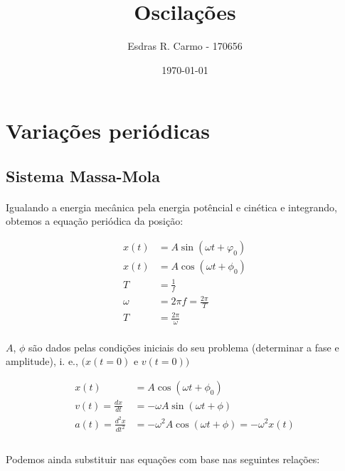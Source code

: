 \documentclass{article}
\author{Esdras R. Carmo - 170656}
\title{Oscilações}
\date{\today}
\begin{document}
    \maketitle
    
    \section{Variações periódicas}
        \subsection{Sistema Massa-Mola}
            \paragraph{}
            Igualando a energia mecânica pela energia potêncial e cinética e integrando, obtemos a equação periódica da
            posição:

            \begin{align*}
                x(t) &= A\sin{(\omega t + \varphi_0)}\\
                x(t) &= A\cos{(\omega t + \phi_0)}\\
                T &= \frac{1}{f}\\
                \omega &= 2\pi f = \frac{2\pi}{T}\\
                T &= \frac{2\pi}{\omega}
            \end{align*}

            \paragraph{}
            $A$, $\phi$ são dados pelas condições iniciais do seu problema (determinar a fase e amplitude), i. e.,
            $(x(t=0)$ e $v(t=0))$

            \begin{align*}
                x(t) &= A\cos{(\omega t + \phi_0)}\\
                v(t) = \frac{dx}{dt} &= -\omega A \sin{(\omega t + \phi)}\\
                a(t) = \frac{d^2x}{dt^2} &= -\omega^2 A \cos{(\omega t + \phi)} = -\omega^2 x(t)\\
            \end{align*}

            \paragraph{}
            Podemos ainda substituir nas equações com base nas seguintes relações:
\end{document}
